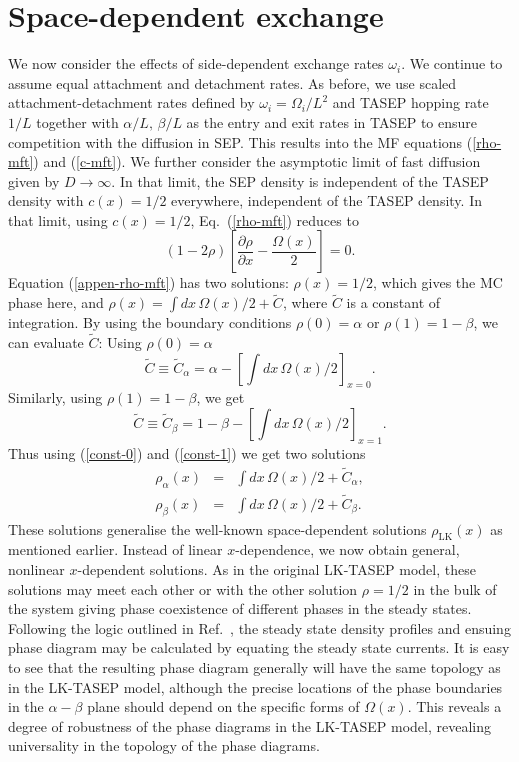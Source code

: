 \documentclass[aps,pre,twocolumn,superscriptaddress,amsmath,amssymb,longbibliography,floatfix,nofootinbib]{revtex4}
\begin{document}
{\appendix

\section{Space-dependent exchange}

We now consider the effects of side-dependent exchange rates $\omega_i$. {We continue to assume equal attachment and detachment rates. As before, we use scaled attachment-detachment rates defined by $\omega_i=\Omega_i/L^2$ and TASEP hopping rate $1/L$ together with $\alpha/L,\,\beta/L$ as the entry and exit rates in TASEP to ensure competition with the diffusion in SEP}. This results into the MF equations (\ref{rho-mft}) and (\ref{c-mft}). We further consider the asymptotic limit of fast diffusion given by $D\rightarrow \infty$. In that limit, the SEP density is independent of the TASEP density with $c(x)=1/2$ everywhere, independent of the TASEP density. In that limit, using $c(x)=1/2$, Eq.~(\ref{rho-mft}) reduces to
\begin{equation}
 (1-2\rho)\left[\frac{\partial\rho}{\partial x}- \frac{\Omega(x)}{2}\right]=0. \label{appen-rho-mft}
\end{equation}
Equation (\ref{appen-rho-mft}) has two solutions: $\rho(x)=1/2$, which gives the MC phase here, and $\rho(x)=\int dx\, \Omega(x)/2 + \tilde C$, where $\tilde C$ is a constant of integration. By using the boundary conditions $\rho(0)=\alpha$ or $\rho(1)=1-\beta$, we can evaluate $\tilde C$: Using $\rho(0)=\alpha$
\begin{equation}
 \tilde C\equiv \tilde C_\alpha = \alpha - \left[\int dx \,\Omega(x)/2\right]_{x=0}.\label{const-0}
\end{equation}
Similarly, using $\rho(1)=1-\beta$, we get
\begin{equation}
 \tilde C\equiv \tilde C_\beta = 1-\beta - \left[\int dx \,\Omega(x)/2\right]_{x=1}.\label{const-1}
\end{equation}
Thus using (\ref{const-0}) and (\ref{const-1}) we get two solutions
\begin{eqnarray}
 \rho_\alpha(x)&=&\int dx \,\Omega(x)/2+\tilde C_\alpha,\\
 \rho_\beta(x)&=&\int dx \,\Omega(x)/2+\tilde C_\beta.
\end{eqnarray}
These solutions generalise the well-known space-dependent solutions $\rho_\text{LK}(x)$ as mentioned earlier. Instead of linear $x$-dependence, we now obtain general, nonlinear $x$-dependent solutions. As in the original LK-TASEP model, these solutions may meet each other or with the other solution $\rho=1/2$ in the bulk of the system giving phase coexistence of different phases in the steady states. Following the logic outlined in Ref.~\cite{frey-lktasep}, the steady state density profiles and ensuing phase diagram may be calculated by equating the steady state currents. It is easy to see that the resulting phase diagram generally will have the same topology as in the LK-TASEP model, although the precise locations of the phase boundaries in the $\alpha-\beta$ plane should depend on the specific forms of $\Omega(x)$. This reveals a degree of robustness of the phase diagrams in the LK-TASEP model, revealing universality in the topology of the phase diagrams.
}
\end{document}
